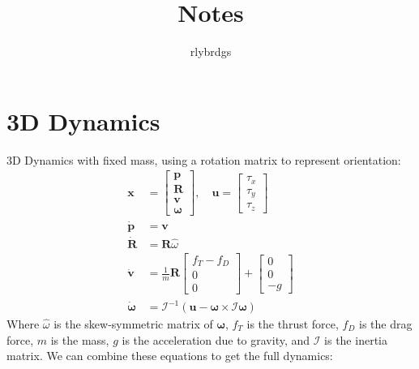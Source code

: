 \documentclass[11pt]{article}
\title{Notes}
\author{rlybrdgs }
\begin{document}
\maketitle
\section{3D Dynamics}
3D Dynamics with fixed mass, using a rotation matrix to represent orientation:
\begin{align*}
    \mathbf{x} &= \begin{bmatrix}
        \mathbf{p} \\ \mathbf{R} \\ \mathbf{v} \\ \mathbf{\omega}
    \end{bmatrix}, \quad
    \mathbf{u} = \begin{bmatrix}
        \tau_x \\ \tau_y \\ \tau_z
    \end{bmatrix} \\
    \dot{\mathbf{p}} &= \mathbf{v} \\
    \dot{\mathbf{R}} &= \mathbf{R} \hat{\omega} \\
    \dot{\mathbf{v}} &= \frac{1}{m} \mathbf{R} \begin{bmatrix}
        f_T - f_D \\ 0 \\ 0
    \end{bmatrix} + \begin{bmatrix}
        0 \\ 0 \\ -g
    \end{bmatrix} \\
    \dot{\mathbf{\omega}} &= \mathcal{I}^{-1} \left( \mathbf{u} - \mathbf{\omega} \times \mathcal{I} \mathbf{\omega} \right)
\end{align*}
Where $\hat{\omega}$ is the skew-symmetric matrix of $\mathbf{\omega}$, $f_T$ is the thrust force, $f_D$ is the drag force, $m$ is the mass, $g$ is the acceleration due to gravity, and $\mathcal{I}$ is the inertia matrix. We can combine these equations to get the full dynamics:
\end{document}
